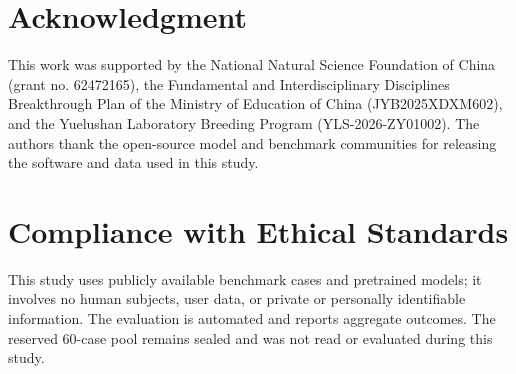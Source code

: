 \documentclass{article}
\begin{document}
\clearpage
\section*{Acknowledgment}
This work was supported by the National Natural Science Foundation of China (grant no. 62472165), the Fundamental and Interdisciplinary Disciplines Breakthrough Plan of the Ministry of Education of China (JYB2025XDXM602), and the Yuelushan Laboratory Breeding Program (YLS-2026-ZY01002). The authors thank the open-source model and benchmark communities for releasing the software and data used in this study.

\section*{Compliance with Ethical Standards}
This study uses publicly available benchmark cases and pretrained models; it involves no human subjects, user data, or private or personally identifiable information. The evaluation is automated and reports aggregate outcomes. The reserved 60-case pool remains sealed and was not read or evaluated during this study.



\end{document}
